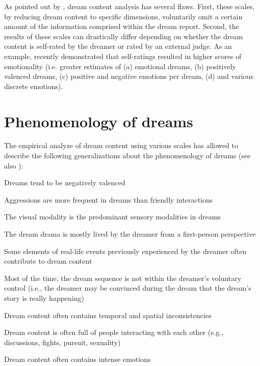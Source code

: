 As pointed out by \citet{schredl_dream_2010}, dream content analysis has several flaws. First, these scales, by reducing dream content to specific dimensions, voluntarily omit a certain amount of the information comprised within the dream report. Second, the results of these scales can drastically differ depending on whether the dream content is self-rated by the dreamer or rated by an external judge. As an example, \citet{sikka_i_2014} recently demonstrated that self-ratings resulted in higher scores of emotionality (i.e. greater estimates of (a) emotional dreams, (b) positively valenced dreams, (c) positive and negative emotions per dream, (d) and various discrete emotions).

\section{Phenomenology of dreams}
\label{sec:dream-content:pheno}

The empirical analyze of dream content using various scales has allowed to describe the following generalizations about the phenomenology of dreams (see also \citealp{hall_content_1966, schwartz_exploration_1999, schredl_characteristics_2010}):

\begin{my_list_item}
    \item Dreams tend to be negatively valenced
	\item Aggressions are more frequent in dreams than friendly interactions
	\item The visual modality is the predominant sensory modalities in dreams
	\item The dream drama is mostly lived by the dreamer from a first-person perspective
	\item Some elements of real-life events previously experienced by the dreamer often contribute to dream content
	\item Most of the time, the dream sequence is not within the dreamer’s voluntary control (i.e., the dreamer may be convinced during the dream that the dream’s story is really happening)
	\item Dream content often contains temporal and spatial inconsistencies
	\item Dream content is often full of people interacting with each other (e.g., discussions, fights, pursuit, sexuality)
	\item Dream content often contains intense emotions
\end{my_list_item}


